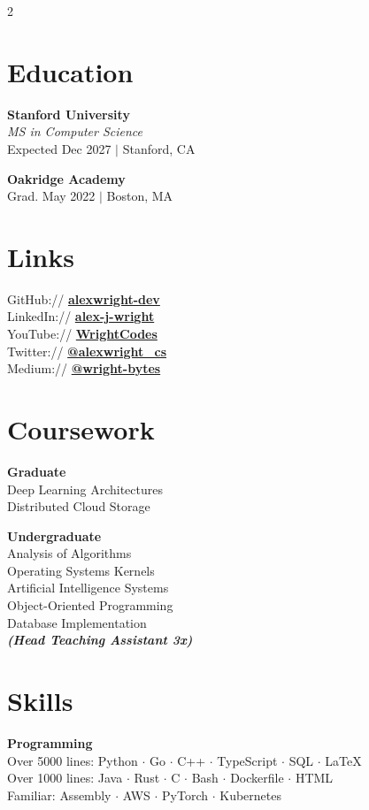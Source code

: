 \documentclass[letterpaper,10pt]{article}
\newcommand{\descript}[1]{{\color{subheadings}\textit{\small #1}}}
\newcommand{\location}[1]{{\color{graytext}\footnotesize #1}}
\newcommand{\runsubsection}[1]{{\color{subheadings}\bfseries\large #1}}
\newcommand{\sectionsep}{\vspace{3pt}}
\begin{document}
\begin{paracol}{2} %

\section{Education}

\runsubsection{Stanford University} \\
\descript{MS in Computer Science} \\
\location{Expected Dec 2027 $|$ Stanford, CA}
\sectionsep

\runsubsection{Oakridge Academy} \\
\location{Grad. May 2022 $|$ Boston, MA}
\sectionsep

\section{Links}
{\small
GitHub:// \href{https://github.com}{\bf alexwright-dev} \\
LinkedIn:// \href{https://linkedin.com}{\bf alex-j-wright} \\
YouTube:// \href{https://youtube.com}{\bf WrightCodes} \\
Twitter:// \href{https://twitter.com}{\bf @alexwright\_cs} \\
Medium:// \href{https://medium.com}{\bf @wright-bytes}
}
\sectionsep

\section{Coursework}
\runsubsection{Graduate} \\
{\small
Deep Learning Architectures \\
Distributed Cloud Storage \\
}
\sectionsep

\runsubsection{Undergraduate} \\
{\small
Analysis of Algorithms \\
Operating Systems Kernels \\
Artificial Intelligence Systems \\
Object-Oriented Programming \\
Database Implementation \\
{\footnotesize \textit{\textbf{(Head Teaching Assistant 3x) }}}
}
\sectionsep

\section{Skills}
\runsubsection{Programming} \\
\location{Over 5000 lines:}
{\small Python $\cdot$ Go $\cdot$ C++ $\cdot$ TypeScript $\cdot$ SQL $\cdot$ \LaTeX} \\
\vspace{2pt}
\location{Over 1000 lines:}
{\small Java $\cdot$ Rust $\cdot$ C $\cdot$ Bash $\cdot$ Dockerfile $\cdot$ HTML} \\
\vspace{2pt}
\location{Familiar:}
{\small Assembly $\cdot$ AWS $\cdot$ PyTorch $\cdot$ Kubernetes}
\sectionsep


\end{paracol}
\end{document}
